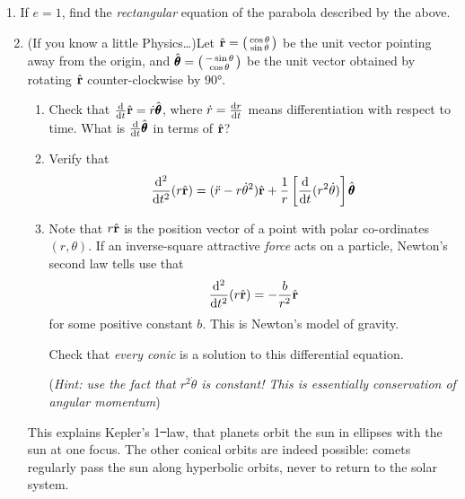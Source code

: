 \begin{exercises}{}{}
\def\hvr{\hat{\vr}}
\def\hth{\hat{\pmb\theta}}
\hangindent\leftmargini
\textup{1. } If $e=1$, find the \emph{rectangular} equation of the parabola described by the above.
\begin{enumerate}\setcounter{enumi}{1}
  \item (If you know a little Physics\ldots)\quad Let $\hvr=\stwovec{\cos\theta}{\sin\theta}$ be the unit vector pointing away from the origin, and $\hth=\stwovec{-\sin\theta}{\cos\theta}$ be the unit vector obtained by rotating $\hvr$ counter-clockwise by \ang{90}.
  \begin{enumerate}
    \item Check that $\diff t\hvr=\dot r\hth$, where $\dot r=\diff[r]{t}$ means differentiation with respect to time. What is $\diff t\hth$ in terms of $\hvr$?
    \item Verify that
    \[\diff[^2]{t^2}(r\hvr) =(\ddot r-r\dot\theta^2)\hvr+\frac 1r\left[\diff t(r^2\dot\theta)\right]\hth\]
    \item Note that $r\hvr$ is the position vector of a point with polar co-ordinates $(r,\theta)$. If an inverse-square attractive \emph{force} acts on a particle, Newton's second law tells use that
    \[\diff[^2]{t^2}(r\hvr) =-\frac b{r^2}\hvr\]
    for some positive constant $b$. This is Newton's model of gravity.\par
    Check that \emph{every conic} is a solution to this differential equation.\par
    (\emph{Hint: use the fact that $r^2\dot\theta$ is constant! This is essentially conservation of angular momentum}) 
  \end{enumerate}
  This explains Kepler's 1\st\ law, that planets orbit the sun in ellipses with the sun at one focus. The other conical orbits are indeed possible: comets regularly pass the sun along hyperbolic orbits, never to return to the solar system.
\end{enumerate}
\end{exercises}


\fi

% 
% 
% 
% 
% 




